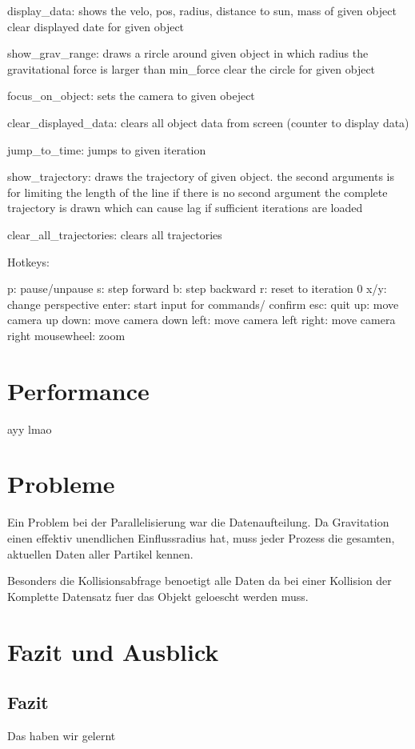 display\_data:
    shows the velo, pos, radius, distance to sun, mass of given object
    clear displayed date for given object

show\_grav\_range:
    draws a rircle around given object in which radius the gravitational force is larger than min\_force
    clear the circle for given object

focus\_on\_object:
    sets the camera to given obeject

clear\_displayed\_data:
    clears all object data from screen (counter to display data)

jump\_to\_time:
    jumps to given iteration

show\_trajectory:
    draws the trajectory of given object.
    the second arguments is for limiting the length of the line
    if there is no second argument the complete trajectory is drawn which can cause lag if
    sufficient iterations are loaded

clear\_all\_trajectories:
    clears all trajectories

Hotkeys:

p:          pause/unpause
s:          step forward
b:          step backward
r:          reset to iteration 0
x/y:        change perspective
enter:      start input for commands/ confirm
esc:        quit
up:         move camera up
down:       move camera down
left:       move camera left
right:      move camera right
mousewheel: zoom


\section{Performance}
ayy lmao

\section{Probleme}
Ein Problem bei der Parallelisierung war die Datenaufteilung. Da Gravitation einen effektiv
unendlichen Einflussradius hat, muss jeder Prozess die gesamten, aktuellen Daten aller
Partikel kennen.

Besonders die Kollisionsabfrage benoetigt alle Daten da bei einer Kollision der Komplette
Datensatz fuer das Objekt geloescht werden muss.

\section{Fazit und Ausblick}
\subsection{Fazit}
Das haben wir gelernt
